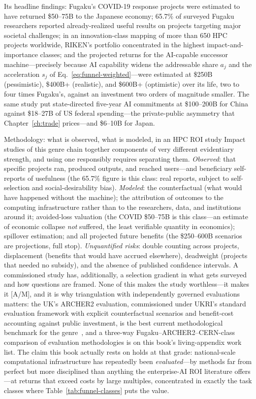 Its headline findings: Fugaku's COVID-19 response projects were estimated to have returned \$50--75B to the Japanese economy; 65.7\% of surveyed Fugaku researchers reported already-realized useful results on projects targeting major societal challenges; in an innovation-class mapping of more than 650 HPC projects worldwide, RIKEN's portfolio concentrated in the highest impact-and-importance classes; and the projected returns for the AI-capable successor machine---precisely because AI capability widens the addressable share $a_j$ and the acceleration $s_j$ of Eq.~\eqref{eq:funnel-weighted}---were estimated at \$250B (pessimistic), \$400B+ (realistic), and \$600B+ (optimistic) over its life, two to four times Fugaku's, against an investment two orders of magnitude smaller. The same study put state-directed five-year AI commitments at \$100--200B for China against \$18--27B of US federal spending---the private-public asymmetry that Chapter~\ref{ch:trade} prices---and \$6--10B for Japan.

\begin{casestudy}{Methodology: what is observed, what is modeled, in an HPC ROI study}
Impact studies of this genre chain together components of very different evidentiary strength, and using one responsibly requires separating them. \emph{Observed}: that specific projects ran, produced outputs, and reached users---and beneficiary self-reports of usefulness (the 65.7\% figure is this class: real reports, subject to self-selection and social-desirability bias). \emph{Modeled}: the counterfactual (what would have happened without the machine); the attribution of outcomes to the computing infrastructure rather than to the researchers, data, and institutions around it; avoided-loss valuation (the COVID \$50--75B is this class---an estimate of economic collapse \emph{not} suffered, the least verifiable quantity in economics); spillover estimation; and all projected future benefits (the \$250--600B scenarios are projections, full stop). \emph{Unquantified risks}: double counting across projects, displacement (benefits that would have accrued elsewhere), deadweight (projects that needed no subsidy), and the absence of published confidence intervals. A commissioned study has, additionally, a selection gradient in what gets surveyed and how questions are framed. None of this makes the study worthless---it makes it [A/M], and it is why triangulation with independently governed evaluations matters: the UK's ARCHER2 evaluation, commissioned under UKRI's standard evaluation framework with explicit counterfactual scenarios and benefit-cost accounting against public investment, is the best current methodological benchmark for the genre~\cite{archer2-eval}, and a three-way Fugaku--ARCHER2--CERN-class comparison of evaluation methodologies is on this book's living-appendix work list. The claim this book actually rests on holds at that grade: national-scale computational infrastructure has repeatedly been \emph{evaluated}---by methods far from perfect but more disciplined than anything the enterprise-AI ROI literature offers---at returns that exceed costs by large multiples, concentrated in exactly the task classes where Table~\ref{tab:funnel-classes} puts the value.
\end{casestudy}

